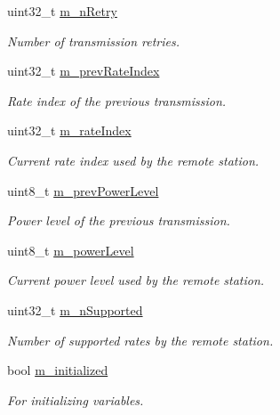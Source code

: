 \begin{DoxyCompactItemize}
uint32\+\_\+t \hyperlink{structns3_1_1ParfWifiRemoteStation_a0bba3ba95bce5d02e391685a050ac394}{m\+\_\+n\+Retry}
\begin{DoxyCompactList}\small\item\em Number of transmission retries. \end{DoxyCompactList}\item 
uint32\+\_\+t \hyperlink{structns3_1_1ParfWifiRemoteStation_a6c09435a42ed3de8115ed6507bb3f5b3}{m\+\_\+prev\+Rate\+Index}
\begin{DoxyCompactList}\small\item\em Rate index of the previous transmission. \end{DoxyCompactList}\item 
uint32\+\_\+t \hyperlink{structns3_1_1ParfWifiRemoteStation_a4954413c2b8ad350908d1b31fde1ecfa}{m\+\_\+rate\+Index}
\begin{DoxyCompactList}\small\item\em Current rate index used by the remote station. \end{DoxyCompactList}\item 
uint8\+\_\+t \hyperlink{structns3_1_1ParfWifiRemoteStation_ac3bb9d05111a5dee5b94fbc2ecade020}{m\+\_\+prev\+Power\+Level}
\begin{DoxyCompactList}\small\item\em Power level of the previous transmission. \end{DoxyCompactList}\item 
uint8\+\_\+t \hyperlink{structns3_1_1ParfWifiRemoteStation_aa8e8e7d3461c4d6003f9bec8a89fe9a4}{m\+\_\+power\+Level}
\begin{DoxyCompactList}\small\item\em Current power level used by the remote station. \end{DoxyCompactList}\item 
uint32\+\_\+t \hyperlink{structns3_1_1ParfWifiRemoteStation_abd1384023d6df405c71d1143833b3697}{m\+\_\+n\+Supported}
\begin{DoxyCompactList}\small\item\em Number of supported rates by the remote station. \end{DoxyCompactList}\item 
bool \hyperlink{structns3_1_1ParfWifiRemoteStation_ab939aeebdd1d940e06642b1985bb4504}{m\+\_\+initialized}
\begin{DoxyCompactList}\small\item\em For initializing variables. \end{DoxyCompactList}\end{DoxyCompactItemize}
